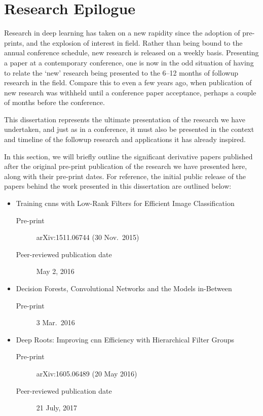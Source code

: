 \documentclass[thesis]{subfiles}
\begin{document}

\chapter{Research Epilogue}
\label{epilogue}
Research in deep learning has taken on a new rapidity since the adoption of pre-prints, and the explosion of interest in field. Rather than being bound to the annual conference schedule, new research is released on a weekly basis. Presenting a paper at a contemporary conference, one is now in the odd situation of having to relate the `new' research being presented to the 6--12 months of followup research in the field. Compare this to even a few years ago, when publication of new research was withheld until a conference paper acceptance, perhaps a couple of months before the conference.

This dissertation represents the ultimate presentation of the research we have undertaken, and just as in a conference, it must also be presented in the context and timeline of the followup research and applications it has already inspired.

In this section, we will briefly outline the significant derivative papers published after the original pre-print publication of the research we have presented here, along with their pre-print dates. For reference, the initial public release of the papers behind the work presented in this dissertation are outlined below:

\begin{itemize}
    \item Training \glspl{cnn} with Low-Rank Filters for Efficient Image Classification~\citep{Ioannou2016}
    \begin{description}
        \item[Pre-print] arXiv:1511.06744 (30 Nov.\ 2015)
        \item[Peer-reviewed publication date] May 2, 2016
    \end{description}
    \item Decision Forests, Convolutional Networks and the Models in-Between~\citep{Ioannou2015}
    \begin{description}
        \item[Pre-print] 3 Mar.\ 2016
    \end{description}
    \item Deep Roots: Improving \gls{cnn} Efficiency with Hierarchical Filter Groups~\citep{ioannou2016e}
    \begin{description}
        \item[Pre-print] arXiv:1605.06489 (20 May 2016)
        \item[Peer-reviewed publication date] 21 July, 2017
    \end{description}
\end{itemize}
\end{document}
